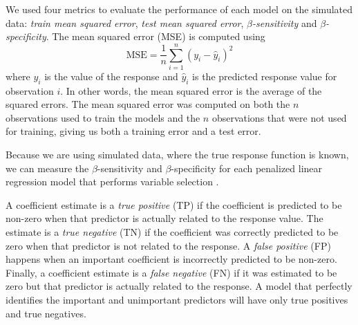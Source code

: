 \documentclass[final,onefignum,onetabnum]{siuro210301}
\begin{document}
	We used four metrics to evaluate the performance of each model on the simulated data: \textit{train mean squared error}, \textit{test mean squared error}, \textit{$\beta$-sensitivity} and \textit{$\beta$-specificity}. The mean squared error (MSE) is computed using
	\begin{equation}
		\text{MSE} = \frac{1}{n}\sum\limits_{i = 1}^n (y_i - \hat{y}_i)^2
	\end{equation}
	where $y_i$ is the value of the response and $\hat{y}_i$ is the predicted response value for observation $i$. In other words, the mean squared error is the average of the squared errors. The mean squared error was computed on both the $n$ observations used to train the models and the $n$ observations that were not used for training, giving us both a training error and a test error.
	
	Because we are using simulated data, where the true response function is known, we can measure the $\beta$-sensitivity and $\beta$-specificity for each penalized linear regression model that performs variable selection \cite{liu2020logsum}. 

	A coefficient estimate is a \textit{true positive} (TP) if the coefficient is predicted to be non-zero when that predictor is actually related to the response value. The estimate is a \textit{true negative} (TN) if the coefficient was correctly predicted to be zero when that predictor is not related to the response. A \textit{false positive} (FP) happens when an important coefficient is incorrectly predicted to be non-zero. Finally, a coefficient estimate is a \textit{false negative} (FN) if it was estimated to be zero but that predictor is actually related to the response. A model that perfectly identifies the important and unimportant predictors will have only true positives and true negatives.
	
\end{document}
